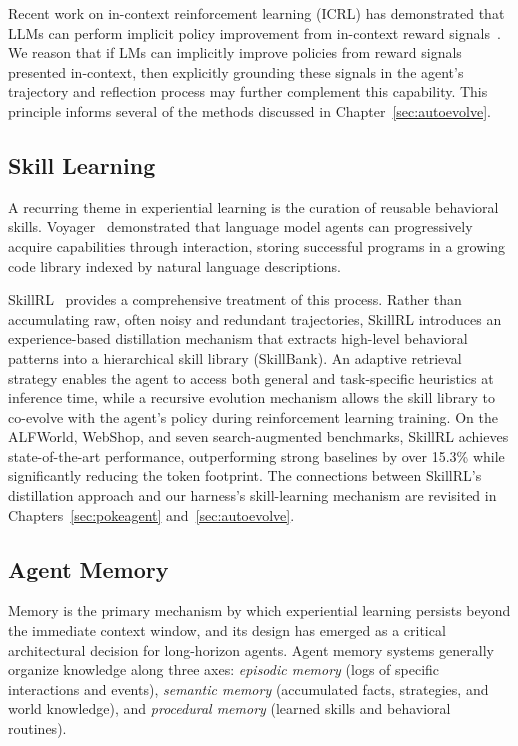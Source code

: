 Recent work on in-context reinforcement learning (ICRL) has demonstrated that LLMs can perform implicit policy improvement from in-context reward signals~\citep{song2025icrl, karten2025economist}. We reason that if LMs can implicitly improve policies from reward signals presented in-context, then explicitly grounding these signals in the agent's trajectory and reflection process may further complement this capability. This principle informs several of the methods discussed in Chapter~\ref{sec:autoevolve}.

\subsection{Skill Learning}\label{sec:skill_learning}

A recurring theme in experiential learning is the curation of reusable behavioral skills. Voyager~\citep{wang2023voyager} demonstrated that language model agents can progressively acquire capabilities through interaction, storing successful programs in a growing code library indexed by natural language descriptions.

SkillRL~\citep{xia2026skillrl} provides a comprehensive treatment of this process. Rather than accumulating raw, often noisy and redundant trajectories, SkillRL introduces an experience-based distillation mechanism that extracts high-level behavioral patterns into a hierarchical skill library (SkillBank). An adaptive retrieval strategy enables the agent to access both general and task-specific heuristics at inference time, while a recursive evolution mechanism allows the skill library to co-evolve with the agent's policy during reinforcement learning training. On the ALFWorld, WebShop, and seven search-augmented benchmarks, SkillRL achieves state-of-the-art performance, outperforming strong baselines by over 15.3\% while significantly reducing the token footprint. The connections between SkillRL's distillation approach and our harness's skill-learning mechanism are revisited in Chapters~\ref{sec:pokeagent} and~\ref{sec:autoevolve}.

\subsection{Agent Memory}\label{sec:agent_memory}

Memory is the primary mechanism by which experiential learning persists beyond the immediate context window, and its design has emerged as a critical architectural decision for long-horizon agents. Agent memory systems generally organize knowledge along three axes: \emph{episodic memory} (logs of specific interactions and events), \emph{semantic memory} (accumulated facts, strategies, and world knowledge), and \emph{procedural memory} (learned skills and behavioral routines).

